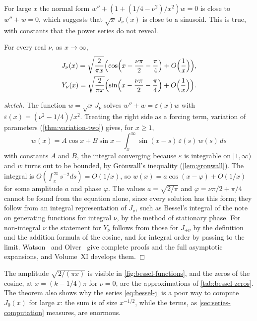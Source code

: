 For large $x$ the normal form $w''+(1+(1/4-\nu^2)/x^2)w=0$ is close to $w''+w=0$, which suggests that $\sqrt x\,J_\nu(x)$ is close to a sinusoid. This is true, with constants that the power series do not reveal.

\begin{theorem}
\label{thm:bessel-asymptotic}
For every real $\nu$, as $x\to\infty$,
\begin{gather*}
J_\nu(x)=\sqrt{\frac2{\pi x}}\Bigl(\cos\Bigl(x-\frac{\nu\pi}2-\frac\pi4\Bigr)+O\Bigl(\frac1x\Bigr)\Bigr),\\
Y_\nu(x)=\sqrt{\frac2{\pi x}}\Bigl(\sin\Bigl(x-\frac{\nu\pi}2-\frac\pi4\Bigr)+O\Bigl(\frac1x\Bigr)\Bigr).
\end{gather*}
\end{theorem}

\begin{proof}[sketch]
The function $w=\sqrt x\,J_\nu$ solves $w''+w=\varepsilon(x)w$ with $\varepsilon(x)=(\nu^2-1/4)/x^2$. Treating the right side as a forcing term, variation of parameters (\cref{thm:variation-two}) gives, for $x\ge1$,
\[
w(x)=A\cos x+B\sin x-\int_x^\infty\sin(x-s)\,\varepsilon(s)\,w(s)\,ds
\]
with constants $A$ and $B$, the integral converging because $\varepsilon$ is integrable on $[1,\infty)$ and $w$ turns out to be bounded, by Gr\"onwall's inequality (\cref{lem:gronwall}). The integral is $O(\int_x^\infty s^{-2}ds)=O(1/x)$, so $w(x)=a\cos(x-\varphi)+O(1/x)$ for some amplitude $a$ and phase $\varphi$. The values $a=\sqrt{2/\pi}$ and $\varphi=\nu\pi/2+\pi/4$ cannot be found from the equation alone, since every solution has this form; they follow from an integral representation of $J_\nu$, such as Bessel's integral of the note on generating functions for integral $\nu$, by the method of stationary phase. For non-integral $\nu$ the statement for $Y_\nu$ follows from those for $J_{\pm\nu}$ by the definition and the addition formula of the cosine, and for integral order by passing to the limit. Watson~\cite[Chap.~VII]{watson1944} and Olver~\cite[Chap.~7]{olver1997asymptotics} give complete proofs and the full asymptotic expansions, and Volume~XI develops them.
\end{proof}

The amplitude $\sqrt{2/(\pi x)}$ is visible in \cref{fig:bessel-functions}, and the zeros of the cosine, at $x=(k-1/4)\pi$ for $\nu=0$, are the approximations of \cref{tab:bessel-zeros}. The theorem also shows why the series \eqref{eq:bessel-j} is a poor way to compute $J_0(x)$ for large $x$: the sum is of size $x^{-1/2}$, while the terms, as \cref{sec:series-computation} measures, are enormous.

